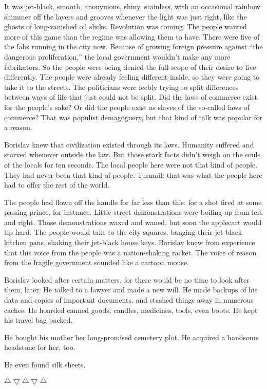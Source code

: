 \documentclass[20 pt,twoside,extrafontsizes,final]{memoir}
\begin{document}
It was jet-black, smooth, anonymous, shiny, stainless, with an occasional rainbow shimmer off the layers and grooves whenever the light was just right, like the ghosts of long-vanished oil slicks. Revolution was coming. The people wanted more of this game than the regime was allowing them to have. There were five of the fabs running in the city now. Because of growing foreign pressure against ``the dangerous proliferation,'' the local government wouldn't make any more fabrikators. So the people were being denied the full scope of their desire to live differently. The people were already feeling different inside, so they were going to take it to the streets. The politicians were feebly trying to split differences between ways of life that just could not be split. Did the laws of commerce exist for the people's sake? Or did the people exist as slaves of the so-called laws of commerce? That was populist demagoguery, but that kind of talk was popular for a reason.

Borislav knew that civilization existed through its laws. Humanity suffered and starved whenever outside the law. But those stark facts didn't weigh on the souls of the locals for ten seconds. The local people here were not that kind of people. They had never been that kind of people. Turmoil: that was what the people here had to offer the rest of the world.

The people had flown off the handle for far less than this; for a shot fired at some passing prince, for instance. Little street demonstrations were boiling up from left and right. Those demonstrations waxed and waned, but soon the applecart would tip hard. The people would take to the city squares, banging their jet-black kitchen pans, shaking their jet-black house keys. Borislav knew from experience that this voice from the people was a nation-shaking racket. The voice of reason from the fragile government sounded like a cartoon mouse.

Borislav looked after certain matters, for there would be no time to look after them, later. He talked to a lawyer and made a new will. He made backups of his data and copies of important documents, and stashed things away in numerous caches. He hoarded canned goods, candles, medicines, tools, even boots. He kept his travel bag packed.

He bought his mother her long-promised cemetery plot. He acquired a handsome headstone for her, too.

He even found silk sheets.

\vfil
\centerline{{$\bigtriangleup\bigtriangledown\bigtriangleup\bigtriangledown\bigtriangleup$}}
\end{document}
